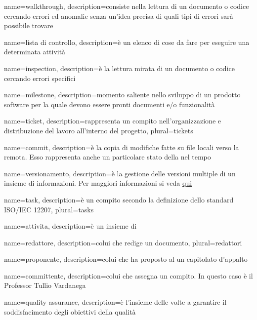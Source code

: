  {
	name=walkthrough,
    description={consiste nella lettura di un documento o codice cercando errori ed anomalie senza un'idea precisa di quali tipi di errori sarà possibile trovare}
}

 {
	name=lista di controllo,
	description={è un elenco di cose da fare per eseguire una determinata attività}
}

 {
	name=inspection,
	description={è la lettura mirata di un documento o codice cercando errori specifici}
}

 {
	name=milestone,
	description={momento saliente nello sviluppo di un prodotto software per la quale devono essere pronti documenti e/o funzionalità}
}

 {
	name=ticket,
	description={rappresenta un compito nell'organizzazione e distribuzione del lavoro all'interno del progetto},
	plural=tickets
}

 {
	name=commit,
	description={è la copia di modifiche fatte su file locali verso la  remota. Esso rappresenta anche un particolare stato della  nel tempo}
}

 {
	name=versionamento,
	description={è la gestione delle versioni multiple di un insieme di informazioni. Per maggiori informazioni si veda \href{http://it. wikipedia.org/wiki/Controllo_versione}{qui}}
}

 {
	name=task,
	description={è un compito secondo la definizione dello standard ISO/IEC 12207},
	plural=tasks
}

 {
	name=attivita,
	description={è un insieme di }
}

 {
	name=redattore,
	description={colui che redige un documento},
	plural=redattori
}

 {
	name=proponente,
	description={colui che ha proposto al  un capitolato d'appalto}
}

 {
	name=committente,
	description={colui che assegna un compito. In questo caso è il Professor Tullio Vardanega}
}

 {
	name=quality assurance,
	description={è l'insieme delle  volte a garantire il soddisfacimento degli obiettivi della qualità}
}

